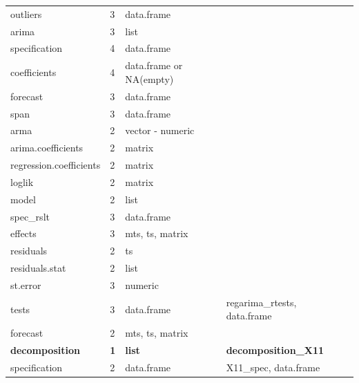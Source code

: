 \documentclass[article]{jss}
\begin{document}
\begin{longtable}{lllll}
\hspace{3em}outliers & 3 & data.frame &  & \\
\addlinespace
\hspace{3em}arima & 3 & list &  & \\
\hspace{4em}specification & 4 & data.frame &  & \\
\hspace{4em}coefficients & 4 & data.frame or NA(empty) &  & \\
\hspace{3em}forecast & 3 & data.frame &  & \\
\hspace{3em}span & 3 & data.frame &  & \\
\addlinespace
\hspace{2em}arma & 2 & vector - numeric &  & \\
\hspace{2em}arima.coefficients & 2 & matrix &  & \\
\hspace{2em}regression.coefficients & 2 & matrix &  & \\
\hspace{2em}loglik & 2 & matrix &  & \\
\hspace{2em}model & 2 & list &  \vphantom{1} & \\
\addlinespace
\hspace{3em}spec\_rslt & 3 & data.frame &  & \\
\hspace{3em}effects & 3 & mts, ts, matrix &  & \\
\hspace{2em}residuals & 2 & ts &  & \\
\hspace{2em}residuals.stat & 2 & list &  & \\
\hspace{3em}st.error & 3 & numeric &  & \\
\addlinespace
\hspace{3em}tests & 3 & data.frame & regarima\_rtests, data.frame & \\
\hspace{2em}forecast & 2 & mts, ts, matrix &  & \\
\textbf{\hspace{1em}decomposition} & \textbf{1} & \textbf{list} & \textbf{decomposition\_X11} & \textbf{}\\
\hspace{2em}specification & 2 & data.frame & X11\_spec, data.frame & \\

\end{longtable}
\end{document}
